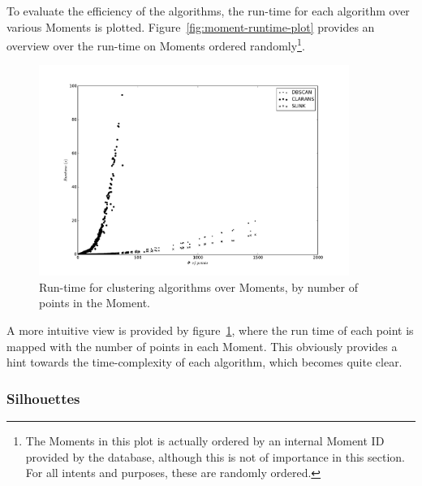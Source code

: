 To evaluate the efficiency of the algorithms, the run-time for 
each algorithm over various Moments is plotted. 
Figure~\ref{fig:moment-runtime-plot} provides an overview over the run-time 
on Moments ordered randomly\footnote{
    The Moments in this plot is actually ordered by an internal Moment ID 
    provided by the database, although this is not of importance in this 
    section. For all intents and purposes, these are randomly ordered.
}. 
 
\begin{figure}[ht]
    \centering
    \includegraphics[width=0.9\textwidth]{plots/moment_runtime_scatter.pdf}
    \caption{Run-time for clustering algorithms over Moments, by number of
        points in the Moment.
    \label{fig:moment-runtime-scatter} }
\end{figure}

A more intuitive view is provided by figure~\ref{fig:moment-runtime-scatter}, 
where the run time of each point is mapped with the number of points in each 
Moment. This obviously provides a hint towards the time-complexity of each 
algorithm, which becomes quite clear. 

\cleartoleftpage

\subsubsection{Silhouettes}

